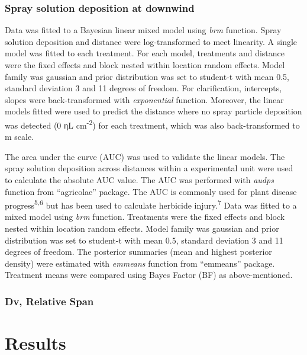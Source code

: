 \documentclass[
  12pt,
  a4paper,
]{article}
\begin{document}
\hypertarget{spray-solution-deposition-at-downwind}{%
\subsubsection{Spray solution deposition at
downwind}\label{spray-solution-deposition-at-downwind}}

Data was fitted to a Bayesian linear mixed model using \emph{brm}
function. Spray solution deposition and distance were log-transformed to
meet linearity. A single model was fitted to each treatment. For each
model, treatments and distance were the fixed effects and block nested
within location random effects. Model family was gaussian and prior
distribution was set to student-t with mean 0.5, standard deviation 3
and 11 degrees of freedom. For clarification, intercepts, slopes were
back-transformed with \emph{exponential} function. Moreover, the linear
models fitted were used to predict the distance where no spray particle
deposition was detected (0 ηL cm\textsuperscript{-2}) for each
treatment, which was also back-transformed to m scale.

The area under the curve (AUC) was used to validate the linear models.
The spray solution deposition across distances within a experimental
unit were used to calculate the absolute AUC value. The AUC was
performed with \emph{audps} function from ``agricolae'' package. The AUC
is commonly used for plant disease progress\textsuperscript{5,6} but has
been used to calculate herbicide injury.\textsuperscript{7} Data was
fitted to a mixed model using \emph{brm} function. Treatments were the
fixed effects and block nested within location random effects. Model
family was gaussian and prior distribution was set to student-t with
mean 0.5, standard deviation 3 and 11 degrees of freedom. The posterior
summaries (mean and highest posterior density) were estimated with
\emph{emmeans} function from ``emmeans'' package. Treatment means were
compared using Bayes Factor (BF) as above-mentioned.

\hypertarget{dv-relative-span}{%
\subsubsection{Dv, Relative Span}\label{dv-relative-span}}

\hypertarget{results}{%
\section{Results}\label{results}}
\end{document}
